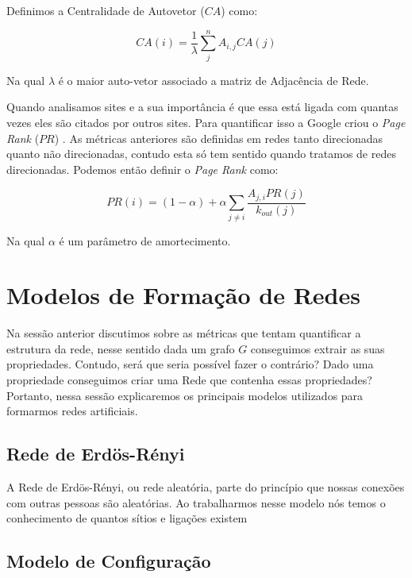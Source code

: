 Definimos a Centralidade de Autovetor ($CA$) como:

\begin{equation}
  CA(i) = \frac{1}{\lambda}\sum_{j}^nA_{i,j}CA(j)
\end{equation}

Na qual $\lambda$ é o maior auto-vetor associado a matriz de Adjacência de Rede.


Quando analisamos sites e a sua importância é que essa está ligada com quantas vezes eles são citados por outros sites. Para quantificar isso a Google criou o \textit{Page Rank} ($PR$) \cite{PageRank}. As métricas anteriores são definidas em redes tanto direcionadas quanto não direcionadas, contudo esta só tem sentido quando tratamos de redes direcionadas. Podemos então definir o \textit{Page Rank} como:

\begin{equation}
  PR(i) = (1 - \alpha) + \alpha\sum_{j \neq i}\frac{A_{j,i}PR(j)}{k_{out}(j)}
\end{equation}

Na qual $\alpha$ é um parâmetro de amortecimento.

\section{Modelos de Formação de Redes}

Na sessão anterior discutimos sobre as métricas que tentam quantificar a estrutura da rede, nesse sentido dada um grafo $G$ conseguimos extrair as suas propriedades. Contudo, será que seria possível fazer o contrário? Dado uma propriedade conseguimos criar uma Rede que contenha essas propriedades? Portanto, nessa sessão explicaremos os principais modelos utilizados para formarmos redes artificiais.

\subsection{Rede de Erdös-Rényi}

A Rede de Erdös-Rényi, ou rede aleatória, parte do princípio que nossas conexões com outras pessoas são aleatórias. Ao trabalharmos nesse modelo nós temos o conhecimento de quantos sítios e ligações existem

\subsection{Modelo de Configuração}

